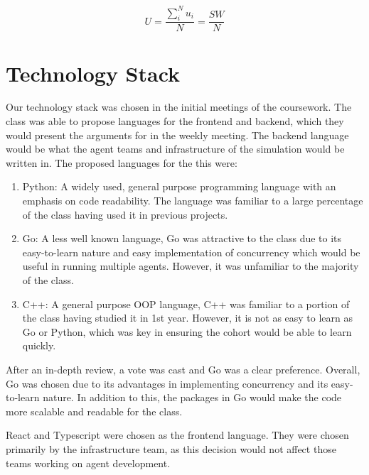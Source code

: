 \begin{equation}\label{utility_eq}
    \mathit{U}=\frac{\sum_i^N u_i}{N}=\frac{\mathit{SW}}{N}
\end{equation}

\section{Technology Stack}

Our technology stack was chosen in the initial meetings of the coursework. The class was able to propose languages for the frontend and backend, which they would present the arguments for in the weekly meeting. The backend language would be what the agent teams and infrastructure of the simulation would be written in. The proposed languages for the this were:

\begin{enumerate}
    \item Python: A widely used, general purpose programming language with an emphasis on code readability. The language was familiar to a large percentage of the class having used it in previous projects. 
    \item Go: A less well known language, Go was attractive to the class due to its easy-to-learn nature and easy implementation of concurrency which would be useful in running multiple agents. However, it was unfamiliar to the majority of the class.
    \item C++: A general purpose OOP language, C++ was familiar to a portion of the class having studied it in 1st year. However, it is not as easy to learn as Go or Python, which was key in ensuring the cohort would be able to learn quickly. 
\end{enumerate}

After an in-depth review, a vote was cast and Go was a clear preference. Overall, Go was chosen due to its advantages in implementing concurrency and its easy-to-learn nature. In addition to this, the packages in Go would make the code more scalable and readable for the class. 

React and Typescript were chosen as the frontend language. They were chosen primarily by the infrastructure team, as this decision would not affect those teams working on agent development. 



